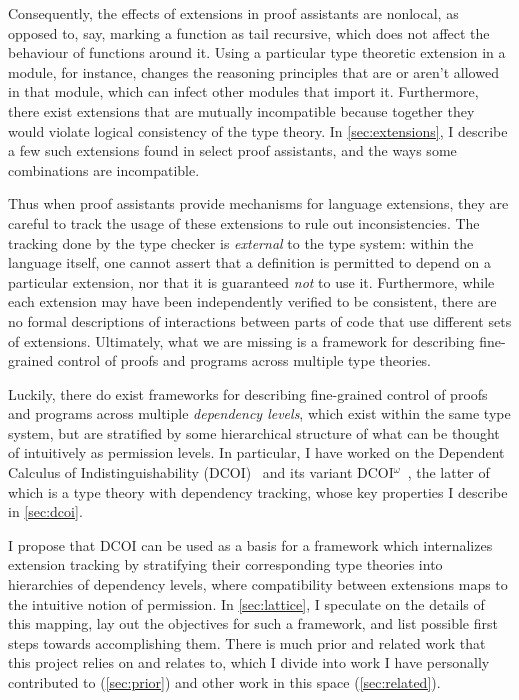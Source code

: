 \documentclass{article}
\begin{document}
Consequently, the effects of extensions in proof assistants are nonlocal,
as opposed to, say, marking a function as tail recursive,
which does not affect the behaviour of functions around it.
Using a particular type theoretic extension in a module, for instance,
changes the reasoning principles that are or aren't allowed in that module,
which can infect other modules that import it.
Furthermore, there exist extensions that are mutually incompatible
because together they would violate logical consistency of the type theory.
In \cref{sec:extensions},
I describe a few such extensions found in select proof assistants,
and the ways some combinations are incompatible.

Thus when proof assistants provide mechanisms for language extensions,
they are careful to track the usage of these extensions to rule out inconsistencies.
The tracking done by the type checker is \emph{external} to the type system:
within the language itself,
one cannot assert that a definition is permitted to depend on a particular extension,
nor that it is guaranteed \emph{not} to use it.
Furthermore, while each extension may have been independently verified to be consistent,
there are no formal descriptions of interactions between parts of code
that use different sets of extensions.
Ultimately, what we are missing is a framework for describing
fine-grained control of proofs and programs across multiple type theories.

Luckily, there do exist frameworks for describing fine-grained control
of proofs and programs across multiple \emph{dependency levels},
which exist within the same type system,
but are stratified by some hierarchical structure
of what can be thought of intuitively as permission levels.
In particular, I have worked on the Dependent Calculus of Indistinguishability
(DCOI)~\citep{dcoi} and its variant DCOI$^\omega$~\citep{dcoi-omega},
the latter of which is a type theory with dependency tracking,
whose key properties I describe in \cref{sec:dcoi}.

I propose that DCOI can be used as a basis for a framework
which internalizes extension tracking by stratifying
their corresponding type theories into hierarchies of dependency levels,
where compatibility between extensions maps to the intuitive notion of permission.
In \cref{sec:lattice}, I speculate on the details of this mapping,
lay out the objectives for such a framework,
and list possible first steps towards accomplishing them.
There is much prior and related work that this project relies on and relates to,
which I divide into work I have personally contributed to (\cref{sec:prior})
and other work in this space (\cref{sec:related}).
\end{document}
